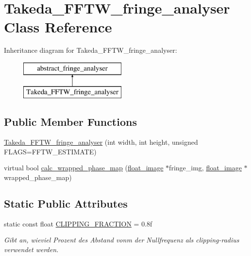 \hypertarget{class_takeda___f_f_t_w__fringe__analyser}{\section{Takeda\-\_\-\-F\-F\-T\-W\-\_\-fringe\-\_\-analyser Class Reference}
\label{class_takeda___f_f_t_w__fringe__analyser}
}
Inheritance diagram for Takeda\-\_\-\-F\-F\-T\-W\-\_\-fringe\-\_\-analyser\-:\begin{figure}[H]
\begin{center}
\leavevmode
\includegraphics[height=2.000000cm]{class_takeda___f_f_t_w__fringe__analyser}
\end{center}
\end{figure}
\subsection*{Public Member Functions}
\begin{DoxyCompactItemize}
\item 
\hyperlink{class_takeda___f_f_t_w__fringe__analyser_a6512c3179a39f48bc25a7c9eb2abf1b0}{Takeda\-\_\-\-F\-F\-T\-W\-\_\-fringe\-\_\-analyser} (int width, int height, unsigned F\-L\-A\-G\-S=F\-F\-T\-W\-\_\-\-E\-S\-T\-I\-M\-A\-T\-E)
\item 
virtual bool \hyperlink{class_takeda___f_f_t_w__fringe__analyser_a0213cf26993557bf87b5c14d8b354582}{calc\-\_\-wrapped\-\_\-phase\-\_\-map} (\hyperlink{classfloat__image}{float\-\_\-image} $\ast$fringe\-\_\-img, \hyperlink{classfloat__image}{float\-\_\-image} $\ast$wrapped\-\_\-phase\-\_\-map)
\end{DoxyCompactItemize}
\subsection*{Static Public Attributes}
\begin{DoxyCompactItemize}
\item 
\hypertarget{class_takeda___f_f_t_w__fringe__analyser_a398b8368d2fd8a3803915d3142af6fc3}{static const float \hyperlink{class_takeda___f_f_t_w__fringe__analyser_a398b8368d2fd8a3803915d3142af6fc3}{C\-L\-I\-P\-P\-I\-N\-G\-\_\-\-F\-R\-A\-C\-T\-I\-O\-N} = 0.\-8f}\label{class_takeda___f_f_t_w__fringe__analyser_a398b8368d2fd8a3803915d3142af6fc3}

\begin{DoxyCompactList}\small\item\em Gibt an, wieviel Prozent des Abstand vonm der Nullfrequenz als clipping-\/radius verwendet werden. \end{DoxyCompactList}\end{DoxyCompactItemize}


